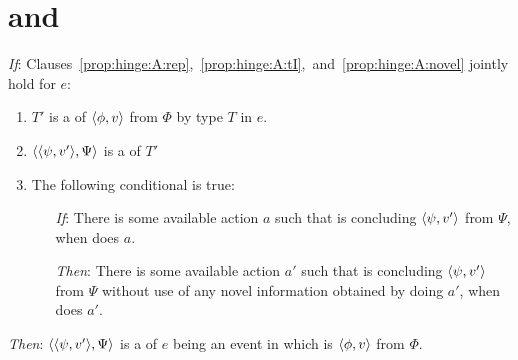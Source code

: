 \section{ and \tC{}}
\label{sec:typicalRequs}

\begin{note}
  \begin{proposition}
    \label{prop:hinge}


    \begin{itenum}
    \item[\emph{If}:]
      Clauses~\ref{prop:hinge:A:rep},~\ref{prop:hinge:A:tI},~and~\ref{prop:hinge:A:novel} jointly hold for \(e\):
      \begin{enumerate}[label=\arabic*., ref=(\arabic*)]
      \item
        \label{prop:hinge:A:rep}
        \(T'\) is a \tRep{} of \vAgent{} \tCV{} \(\langle \phi, v \rangle\) from \(\Phi\) by type \(T\) in \(e\).
      \item
        \label{prop:hinge:A:tI}
        \(\langle \langle \psi, v' \rangle, \Psi \rangle\) is a \tI{} of \(T'\)
      \item
        \label{prop:hinge:A:novel}
        The following conditional is true:
        \begin{itemize}
        \item[\emph{If}:]
          There is some available action \(a\) such that \vAgent{} is concluding \(\langle \psi, v' \rangle\) from \(\Psi\), when \vAgent{} does \(a\).
        \item[\emph{Then}:]
          There is some available action \(a'\) such that \vAgent{} is concluding \(\langle \psi, v' \rangle\) from \(\Psi\) without use of any novel information obtained by doing \(a'\), when \vAgent{} does \(a'\).
        \end{itemize}
      \end{enumerate}
    \item[\emph{Then}:]
      \(\langle \langle \psi, v' \rangle, \Psi \rangle\) is a \requ{} of \(e\) being an event in which \vAgent{} is \tCV{} \(\langle \phi, v \rangle\) from \(\Phi\).
    \end{itenum}
    \vspace{-\baselineskip}
  \end{proposition}


\end{note}
